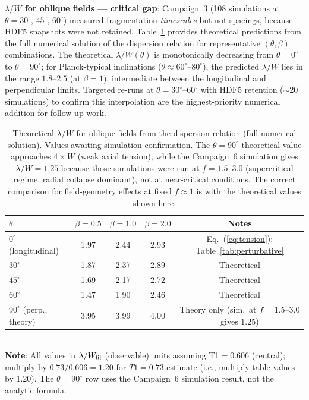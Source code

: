 \documentclass[twoside,twocolumn]{mnras}
\begin{document}
\textbf{$\lambda/W$ for oblique fields --- critical gap}: Campaign~3 (108 simulations at $\theta = 30^\circ$, $45^\circ$, $60^\circ$) measured fragmentation
\textit{timescales} but not spacings, because HDF5 snapshots were not retained. Table~\ref{tab:oblique_theory} provides theoretical predictions from the full numerical solution of the \citet{Nakamura1993} dispersion relation for representative $(\theta, \beta)$ combinations. The theoretical $\lambda/W(\theta)$ is monotonically decreasing from $\theta=0^\circ$ to $\theta=90^\circ$; for Planck-typical inclinations ($\theta \approx 60^\circ$--$80^\circ$), the predicted $\lambda/W$ lies in the range $1.8$--$2.5$ (at $\beta=1$), intermediate between the longitudinal and perpendicular limits. Targeted re-runs at $\theta = 30^\circ$--$60^\circ$ with HDF5 retention ($\sim$20 simulations) to confirm this interpolation are the highest-priority numerical addition for follow-up work.

\begin{table}
\caption{Theoretical $\lambda/W$ for oblique fields from the \citet{Nakamura1993} dispersion relation (full numerical solution). Values awaiting simulation confirmation. The $\theta=90^\circ$ theoretical value approaches $4\times W$ (weak axial tension), while the Campaign~6 simulation gives $\lambda/W=1.25$ because those simulations were run at $f=1.5$--$3.0$ (supercritical regime, radial collapse dominant), not at near-critical conditions. The correct comparison for field-geometry effects at fixed $f\approx 1$ is with the theoretical values shown here.}
\label{tab:oblique_theory}
\small
\begin{tabular}{lcccc}
\toprule
$\theta$ & $\beta=0.5$ & $\beta=1.0$ & $\beta=2.0$ & Notes \\
\midrule
$0^\circ$ (longitudinal) & 1.97 & 2.44 & 2.93 & Eq.~(\ref{eq:tension}); Table~\ref{tab:perturbative} \\
$30^\circ$ & 1.87 & 2.37 & 2.89 & Theoretical \\
$45^\circ$ & 1.69 & 2.17 & 2.72 & Theoretical \\
$60^\circ$ & 1.47 & 1.90 & 2.46 & Theoretical \\
$90^\circ$ (perp., theory) & 3.95 & 3.99 & 4.00 & Theory only (sim.\ at $f=1.5$--$3.0$ gives 1.25) \\
\bottomrule
\end{tabular}
\\ \footnotesize \textbf{Note}: All values in $\lambda/W_{\rm fil}$ (observable) units assuming T1$=0.606$ (central); multiply by $0.73/0.606 = 1.20$ for $T1=0.73$ estimate (i.e., multiply table values by 1.20). The $\theta=90^\circ$ row uses the Campaign~6 simulation result, not the analytic formula.
\end{table}
\end{document}
